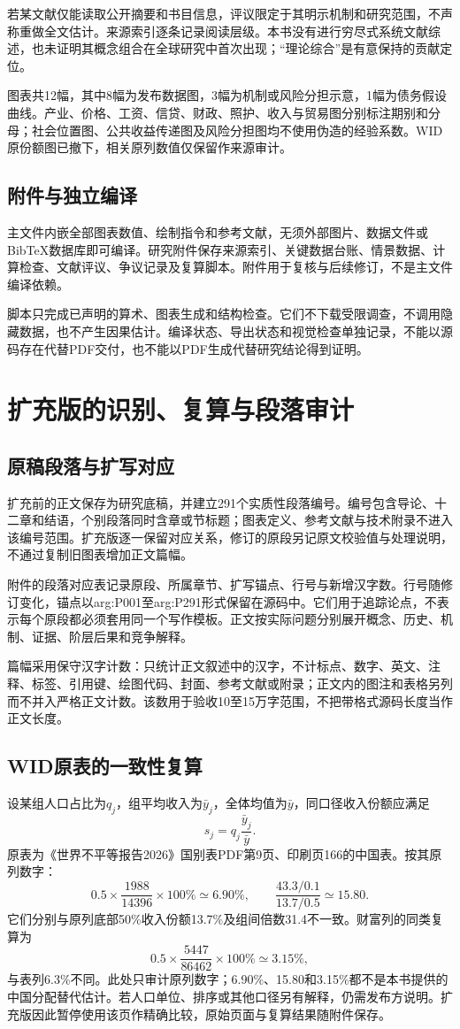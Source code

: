 \documentclass[UTF8,fontset=fandol,zihao=-4,oneside,openany]{ctexbook}
\begin{document}
若某文献仅能读取公开摘要和书目信息，评议限定于其明示机制和研究范围，不声称重做全文估计。来源索引逐条记录阅读层级。本书没有进行穷尽式系统文献综述，也未证明其概念组合在全球研究中首次出现；“理论综合”是有意保持的贡献定位。

图表共12幅，其中8幅为发布数据图，3幅为机制或风险分担示意，1幅为债务假设曲线。产业、价格、工资、信贷、财政、照护、收入与贸易图分别标注期别和分母；社会位置图、公共收益传递图及风险分担图均不使用伪造的经验系数。WID原份额图已撤下，相关原列数值仅保留作来源审计。

\section{附件与独立编译}
主文件内嵌全部图表数值、绘制指令和参考文献，无须外部图片、数据文件或BibTeX数据库即可编译。研究附件保存来源索引、关键数据台账、情景数据、计算检查、文献评议、争议记录及复算脚本。附件用于复核与后续修订，不是主文件编译依赖。

脚本只完成已声明的算术、图表生成和结构检查。它们不下载受限调查，不调用隐藏数据，也不产生因果估计。编译状态、导出状态和视觉检查单独记录，不能以源码存在代替PDF交付，也不能以PDF生成代替研究结论得到证明。

\chapter{扩充版的识别、复算与段落审计}
\section{原稿段落与扩写对应}
扩充前的正文保存为研究底稿，并建立291个实质性段落编号。编号包含导论、十二章和结语，个别段落同时含章或节标题；图表定义、参考文献与技术附录不进入该编号范围。扩充版逐一保留对应关系，修订的原段另记原文校验值与处理说明，不通过复制旧图表增加正文篇幅。

附件的段落对应表记录原段、所属章节、扩写锚点、行号与新增汉字数。行号随修订变化，锚点以arg:P001至arg:P291形式保留在源码中。它们用于追踪论点，不表示每个原段都必须套用同一个写作模板。正文按实际问题分别展开概念、历史、机制、证据、阶层后果和竞争解释。

篇幅采用保守汉字计数：只统计正文叙述中的汉字，不计标点、数字、英文、注释、标签、引用键、绘图代码、封面、参考文献或附录；正文内的图注和表格另列而不并入严格正文计数。该数用于验收10至15万字范围，不把带格式源码长度当作正文长度。

\section{WID原表的一致性复算}
设某组人口占比为$q_j$，组平均收入为$\bar y_j$，全体均值为$\bar y$，同口径收入份额应满足
\[
s_j=q_j\frac{\bar y_j}{\bar y}.
\]
原表为《世界不平等报告2026》国别表PDF第9页、印刷页166的中国表。按其原列数字：
\[
0.5\times\frac{1988}{14396}\times100\%\simeq6.90\%,\qquad
\frac{43.3/0.1}{13.7/0.5}\simeq15.80.
\]
它们分别与原列底部50\%收入份额13.7\%及组间倍数31.4不一致。财富列的同类复算为
\[
0.5\times\frac{5447}{86462}\times100\%\simeq3.15\%,
\]
与表列6.3\%不同。此处只审计原列数字；6.90\%、15.80和3.15\%都不是本书提供的中国分配替代估计。若人口单位、排序或其他口径另有解释，仍需发布方说明。扩充版因此暂停使用该页作精确比较，原始页面与复算结果随附件保存。\cite{WID2026}
\end{document}
